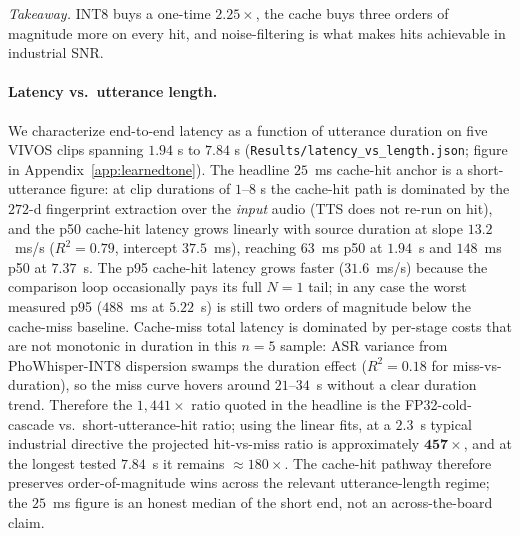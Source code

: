 \documentclass[a4paper,fleqn]{cas-dc}
\begin{document}
\noindent\textit{Takeaway.} INT8 buys a one-time $2.25\times$, the cache buys three orders of magnitude more on every hit, and noise-filtering is what makes hits achievable in industrial SNR.

\paragraph{Latency vs.\ utterance length.} We characterize end-to-end latency as a function of utterance duration on five VIVOS clips spanning $1.94$ s to $7.84$ s (\texttt{Results/latency\_vs\_length.json}; figure in Appendix~\ref{app:learnedtone}). The headline $25$~ms cache-hit anchor is a short-utterance figure: at clip durations of $1$--$8$ s the cache-hit path is dominated by the $272$-d fingerprint extraction over the \emph{input} audio (TTS does not re-run on hit), and the p50 cache-hit latency grows linearly with source duration at slope $13.2$~ms/s ($R^{2} = 0.79$, intercept $37.5$~ms), reaching $63$~ms p50 at $1.94$~s and $148$~ms p50 at $7.37$~s. The p95 cache-hit latency grows faster ($31.6$~ms/s) because the comparison loop occasionally pays its full $N=1$ tail; in any case the worst measured p95 ($488$~ms at $5.22$~s) is still two orders of magnitude below the cache-miss baseline. Cache-miss total latency is dominated by per-stage costs that are not monotonic in duration in this $n=5$ sample: ASR variance from PhoWhisper-INT8 dispersion swamps the duration effect ($R^{2} = 0.18$ for miss-vs-duration), so the miss curve hovers around $21$--$34$~s without a clear duration trend. Therefore the $1{,}441\times$ ratio quoted in the headline is the FP32-cold-cascade vs.\ short-utterance-hit ratio; using the linear fits, at a $2.3$~s typical industrial directive the projected hit-vs-miss ratio is approximately $\mathbf{457\times}$, and at the longest tested $7.84$~s it remains $\approx 180\times$. The cache-hit pathway therefore preserves order-of-magnitude wins across the relevant utterance-length regime; the $25$~ms figure is an honest median of the short end, not an across-the-board claim.
\end{document}
